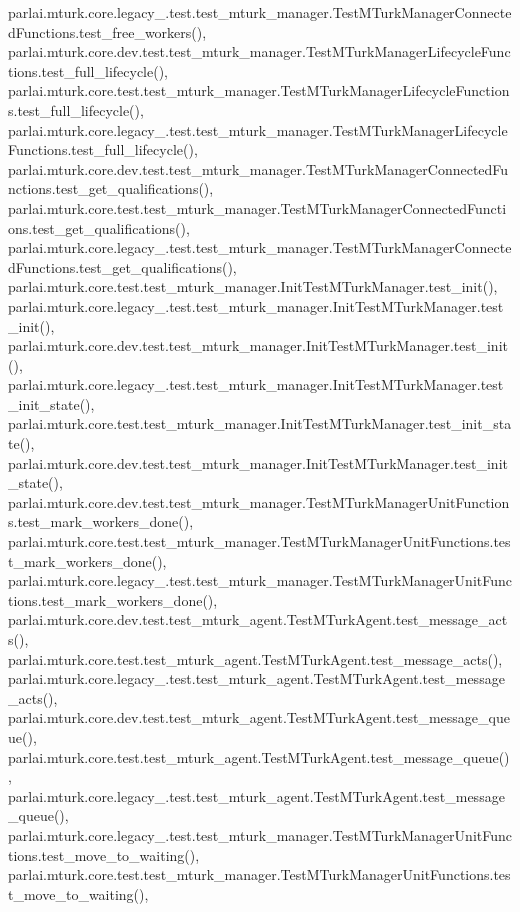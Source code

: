 parlai.\+mturk.\+core.\+legacy\+\_.\+test.\+test\+\_\+mturk\+\_\+manager.\+Test\+M\+Turk\+Manager\+Connected\+Functions.\+test\+\_\+free\+\_\+workers(), parlai.\+mturk.\+core.\+dev.\+test.\+test\+\_\+mturk\+\_\+manager.\+Test\+M\+Turk\+Manager\+Lifecycle\+Functions.\+test\+\_\+full\+\_\+lifecycle(), parlai.\+mturk.\+core.\+test.\+test\+\_\+mturk\+\_\+manager.\+Test\+M\+Turk\+Manager\+Lifecycle\+Functions.\+test\+\_\+full\+\_\+lifecycle(), parlai.\+mturk.\+core.\+legacy\+\_.\+test.\+test\+\_\+mturk\+\_\+manager.\+Test\+M\+Turk\+Manager\+Lifecycle\+Functions.\+test\+\_\+full\+\_\+lifecycle(), parlai.\+mturk.\+core.\+dev.\+test.\+test\+\_\+mturk\+\_\+manager.\+Test\+M\+Turk\+Manager\+Connected\+Functions.\+test\+\_\+get\+\_\+qualifications(), parlai.\+mturk.\+core.\+test.\+test\+\_\+mturk\+\_\+manager.\+Test\+M\+Turk\+Manager\+Connected\+Functions.\+test\+\_\+get\+\_\+qualifications(), parlai.\+mturk.\+core.\+legacy\+\_.\+test.\+test\+\_\+mturk\+\_\+manager.\+Test\+M\+Turk\+Manager\+Connected\+Functions.\+test\+\_\+get\+\_\+qualifications(), parlai.\+mturk.\+core.\+test.\+test\+\_\+mturk\+\_\+manager.\+Init\+Test\+M\+Turk\+Manager.\+test\+\_\+init(), parlai.\+mturk.\+core.\+legacy\+\_.\+test.\+test\+\_\+mturk\+\_\+manager.\+Init\+Test\+M\+Turk\+Manager.\+test\+\_\+init(), parlai.\+mturk.\+core.\+dev.\+test.\+test\+\_\+mturk\+\_\+manager.\+Init\+Test\+M\+Turk\+Manager.\+test\+\_\+init(), parlai.\+mturk.\+core.\+legacy\+\_.\+test.\+test\+\_\+mturk\+\_\+manager.\+Init\+Test\+M\+Turk\+Manager.\+test\+\_\+init\+\_\+state(), parlai.\+mturk.\+core.\+test.\+test\+\_\+mturk\+\_\+manager.\+Init\+Test\+M\+Turk\+Manager.\+test\+\_\+init\+\_\+state(), parlai.\+mturk.\+core.\+dev.\+test.\+test\+\_\+mturk\+\_\+manager.\+Init\+Test\+M\+Turk\+Manager.\+test\+\_\+init\+\_\+state(), parlai.\+mturk.\+core.\+dev.\+test.\+test\+\_\+mturk\+\_\+manager.\+Test\+M\+Turk\+Manager\+Unit\+Functions.\+test\+\_\+mark\+\_\+workers\+\_\+done(), parlai.\+mturk.\+core.\+test.\+test\+\_\+mturk\+\_\+manager.\+Test\+M\+Turk\+Manager\+Unit\+Functions.\+test\+\_\+mark\+\_\+workers\+\_\+done(), parlai.\+mturk.\+core.\+legacy\+\_.\+test.\+test\+\_\+mturk\+\_\+manager.\+Test\+M\+Turk\+Manager\+Unit\+Functions.\+test\+\_\+mark\+\_\+workers\+\_\+done(), parlai.\+mturk.\+core.\+dev.\+test.\+test\+\_\+mturk\+\_\+agent.\+Test\+M\+Turk\+Agent.\+test\+\_\+message\+\_\+acts(), parlai.\+mturk.\+core.\+test.\+test\+\_\+mturk\+\_\+agent.\+Test\+M\+Turk\+Agent.\+test\+\_\+message\+\_\+acts(), parlai.\+mturk.\+core.\+legacy\+\_.\+test.\+test\+\_\+mturk\+\_\+agent.\+Test\+M\+Turk\+Agent.\+test\+\_\+message\+\_\+acts(), parlai.\+mturk.\+core.\+dev.\+test.\+test\+\_\+mturk\+\_\+agent.\+Test\+M\+Turk\+Agent.\+test\+\_\+message\+\_\+queue(), parlai.\+mturk.\+core.\+test.\+test\+\_\+mturk\+\_\+agent.\+Test\+M\+Turk\+Agent.\+test\+\_\+message\+\_\+queue(), parlai.\+mturk.\+core.\+legacy\+\_.\+test.\+test\+\_\+mturk\+\_\+agent.\+Test\+M\+Turk\+Agent.\+test\+\_\+message\+\_\+queue(), parlai.\+mturk.\+core.\+legacy\+\_.\+test.\+test\+\_\+mturk\+\_\+manager.\+Test\+M\+Turk\+Manager\+Unit\+Functions.\+test\+\_\+move\+\_\+to\+\_\+waiting(), parlai.\+mturk.\+core.\+test.\+test\+\_\+mturk\+\_\+manager.\+Test\+M\+Turk\+Manager\+Unit\+Functions.\+test\+\_\+move\+\_\+to\+\_\+waiting(), 